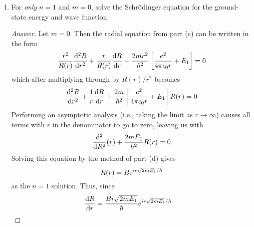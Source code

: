 \documentclass[../psets.tex]{subfiles}
\begin{document}
\begin{enumerate}
\begin{enumerate}
\begin{proof}[Answer]
\begin{align*}
                m &= 0,\pm 1,\pm 2,\dots&
                    m &= 0,\pm 1,\pm 2,\dots
            \end{align*}
            i.e., that overall,
            \begin{equation*}
                \boxed{m = 0,\pm 1,\pm 2,\dots}
            \end{equation*}
            Thus, the general solution can be written as one equation
            \begin{equation*}
                \boxed{Q(\phi) = A\e[im\phi]}
            \end{equation*}
            Indeed, these results show that the angular wave functions of this system are identical to those of the rigid rotor, as we would expect considering that both systems describe a quantum particle at some invariant distance from the nucleus.
        \end{proof}
        \item For \emph{only} $n=1$ and $m=0$, solve the Schr\"{o}dinger equation for the ground-state energy and wave function.
        \begin{proof}[Answer]
            Let $m=0$. Then the radial equation from part (c) can be written in the form
            \begin{equation*}
                \frac{r^2}{R(r)}\dv[2]{R}{r}+\frac{r}{R(r)}\dv{R}{r}+\frac{2mr^2}{\hbar^2}\left[ \frac{e^2}{4\pi\epsilon_0r}+E_1 \right] = 0
            \end{equation*}
            which after multiplying through by $R(r)/r^2$ becomes
            \begin{equation*}
                \dv[2]{R}{r}+\frac{1}{r}\dv{R}{r}+\frac{2m}{\hbar^2}\left[ \frac{e^2}{4\pi\epsilon_0r}+E_1 \right]R(r) = 0
            \end{equation*}
            Performing an asymptotic analysis (i.e., taking the limit as $r\to\infty$) causes all terms with $r$ in the denominator to go to zero, leaving us with
            \begin{equation*}
                \dv[2]{R}(r)+\frac{2mE_1}{\hbar^2}R(r) = 0
            \end{equation*}
            Solving this equation by the method of part (d) gives
            \begin{equation*}
                R(r) = B\e[ir\sqrt{2mE_1}/\hbar]
            \end{equation*}
            as the $n=1$ solution. Thus, since
            \begin{align*}
                \dv{R}{r} &= \frac{Bi\sqrt{2mE_1}}{\hbar}\e[ir\sqrt{2mE_1}/\hbar]&

\end{align*}
\end{proof}
\end{enumerate}
\end{enumerate}
\end{document}
